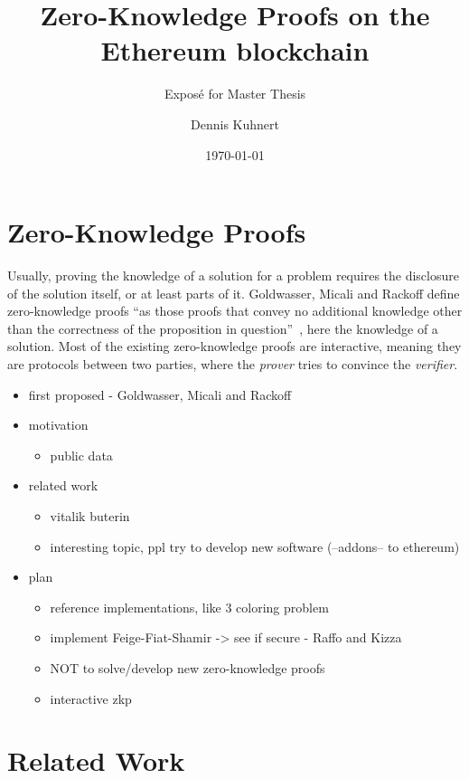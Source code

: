 \documentclass[a4paper,parskip=half]{scrartcl}
\title{Zero-Knowledge Proofs on the Ethereum blockchain}
\subtitle{Exposé for Master Thesis}
\author{Dennis Kuhnert}
\date{\today}
\begin{document}
\maketitle


\section{Zero-Knowledge Proofs}

Usually, proving the knowledge of a solution for a problem requires the disclosure of the solution itself, or at least parts of it.
Goldwasser, Micali and Rackoff define zero-knowledge proofs ``as those proofs that convey no additional knowledge other than the correctness of the proposition in question''~\cite{goldwasser1989knowledge}, here the knowledge of a solution.
Most of the existing zero-knowledge proofs are interactive, meaning they are protocols between two parties, where the \emph{prover} tries to convince the \emph{verifier}.

\begin{itemize}
\item first proposed - Goldwasser, Micali and Rackoff \cite{goldwasser1989knowledge}
\item motivation
	\begin{itemize}
	\item public data
	\end{itemize}
\item related work
	\begin{itemize}
	\item vitalik buterin \cite{buterin2015public}
	\item interesting topic, ppl try to develop new software (--addons-- to ethereum)
	\end{itemize}
\item plan
	\begin{itemize}
	\item reference implementations, like 3 coloring problem
	\item implement Feige-Fiat-Shamir -> see if secure - Raffo and Kizza \cite{raffo2002digital, kizza2010feige}
	\item NOT to solve/develop new zero-knowledge proofs
	\item interactive zkp
	\end{itemize}
\end{itemize}

\section{Related Work}



\end{document}

